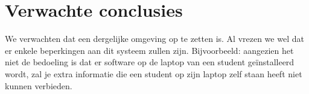 \section{Verwachte conclusies}
\label{sec:verwachte_conclusies}

We verwachten dat een dergelijke omgeving op te zetten is. Al vrezen we wel dat er enkele beperkingen aan dit systeem zullen zijn. Bijvoorbeeld: aangezien het niet de bedoeling is dat er software op de laptop van een student geïnstalleerd wordt, zal je extra informatie die een student op zijn laptop zelf staan heeft niet kunnen verbieden. 

